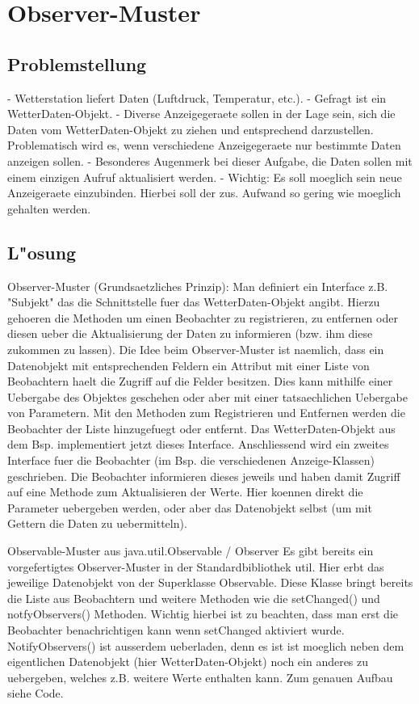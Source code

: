 \section{Observer-Muster}
\subsection{Problemstellung}
- Wetterstation liefert Daten (Luftdruck, Temperatur, etc.).
- Gefragt ist ein WetterDaten-Objekt. 
- Diverse Anzeigegeraete sollen in der Lage sein, sich die Daten vom WetterDaten-Objekt zu ziehen 
  und entsprechend darzustellen. Problematisch wird es, wenn verschiedene Anzeigegeraete nur 
  bestimmte Daten anzeigen sollen. 
- Besonderes Augenmerk bei dieser Aufgabe, die Daten sollen mit einem einzigen Aufruf 
  aktualisiert werden. 
- Wichtig: Es soll moeglich sein neue Anzeigeraete einzubinden. Hierbei soll der zus. Aufwand so 
  gering wie moeglich gehalten werden. 

\subsection{L"osung}
Observer-Muster (Grundsaetzliches Prinzip):
Man definiert ein Interface z.B. "Subjekt" das die Schnittstelle fuer das WetterDaten-Objekt 
angibt. Hierzu gehoeren die Methoden um einen Beobachter zu registrieren, zu entfernen oder 
diesen ueber die Aktualisierung der Daten zu informieren (bzw. ihm diese zukommen zu lassen). Die 
Idee beim Observer-Muster ist naemlich, dass ein Datenobjekt mit entsprechenden Feldern ein 
Attribut mit einer Liste von Beobachtern haelt die Zugriff auf die Felder besitzen. Dies kann 
mithilfe einer Uebergabe des Objektes geschehen oder aber mit einer tatsaechlichen Uebergabe von 
Parametern. Mit den Methoden zum Registrieren und Entfernen werden die Beobachter der Liste 
hinzugefuegt oder entfernt. Das WetterDaten-Objekt aus dem Bsp. implementiert jetzt dieses 
Interface. Anschliessend wird ein zweites Interface fuer die Beobachter (im Bsp. die 
verschiedenen Anzeige-Klassen) geschrieben. Die Beobachter informieren dieses jeweils und haben 
damit Zugriff auf eine Methode zum Aktualisieren der Werte. Hier koennen direkt die Parameter 
uebergeben werden, oder aber das Datenobjekt selbst (um mit Gettern die Daten zu uebermitteln). 

Observable-Muster aus java.util.Observable / Observer 
Es gibt bereits ein vorgefertigtes Observer-Muster in der Standardbibliothek util. Hier erbt das 
jeweilige Datenobjekt von der Superklasse Observable. Diese Klasse bringt bereits die Liste aus 
Beobachtern und weitere Methoden wie die setChanged() und notfyObservers() Methoden. Wichtig 
hierbei ist zu beachten, dass man erst die Beobachter benachrichtigen kann wenn setChanged 
aktiviert wurde. NotifyObservers() ist ausserdem ueberladen, denn es ist ist moeglich neben dem 
eigentlichen Datenobjekt (hier WetterDaten-Objekt) noch ein anderes zu uebergeben, welches z.B. 
weitere Werte enthalten kann. 
Zum genauen Aufbau siehe Code.

